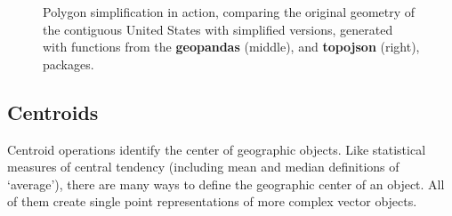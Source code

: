 \documentclass[
  letterpaper,
]{krantz}
\begin{document}
\begin{figure}

\begin{minipage}{0.33\linewidth}



\end{minipage}%
%
\begin{minipage}{0.33\linewidth}



\end{minipage}%
%
\begin{minipage}{0.33\linewidth}



\end{minipage}%

\caption{\label{fig-simplify-polygons}Polygon simplification in action,
comparing the original geometry of the contiguous United States with
simplified versions, generated with functions from the
\textbf{geopandas} (middle), and \textbf{topojson} (right), packages.}

\end{figure}%

\subsection{Centroids}\label{sec-centroids}

Centroid operations identify the center of geographic objects. Like
statistical measures of central tendency (including mean and median
definitions of `average'), there are many ways to define the geographic
center of an object. All of them create single point representations of
more complex vector objects.
\end{document}
